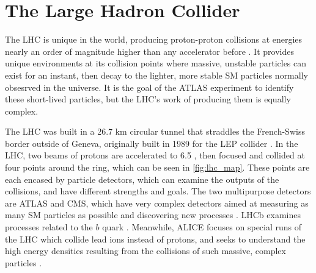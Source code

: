 
\chapter{The Large Hadron Collider} %

\label{ch:lhc} %


The \ac{LHC} is unique in the world, producing proton-proton collisions at energies nearly an order of magnitude higher than any accelerator before \cite{1748-0221-3-08-S08001}. It provides unique environments at its collision points where massive, unstable particles can exist for an instant, then decay to the lighter, more stable \ac{SM} particles normally obsesrved in the universe. It is the goal of the \ac{ATLAS} experiment to identify these short-lived particles, but the \ac{LHC}'s work of producing them is equally complex. 

The \ac{LHC} was built in a 26.7 km circular tunnel that straddles the French-Swiss border outside of Geneva, originally built in 1989 for the \ac{LEP} collider \cite{lep_tdr}. In the \ac{LHC}, two beams of protons are accelerated to 6.5 \tev, then focused and collided at four points around the ring, which can be seen in \autoref{fig:lhc_map}. These points are each encased by particle detectors, which can examine the outputs of the collisions, and have different strengths and goals. The two multipurpose detectors are \ac{ATLAS} and \ac{CMS}, which have very complex detectors aimed at measuring as many \ac{SM} particles as possible and discovering new processes \cite{PERF-2007-01, 1748-0221-3-08-S08004}. \ac{LHCb} examines processes related to the $b$ quark \cite{1748-0221-3-08-S08005}. Meanwhile, \ac{ALICE} focuses on special runs of the \ac{LHC} which collide lead ions instead of protons, and seeks to understand the high energy densities resulting from the collisions of such massive, complex particles \cite{1748-0221-3-08-S08002}. 

